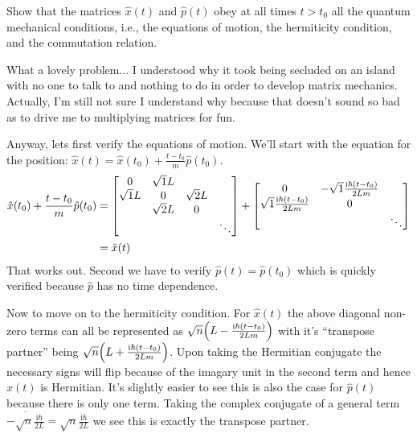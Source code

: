 \documentclass[boxes,pages]{homework}
\makeatletter
\newcommand{\iu}{\mathrm{i}}
\numberwithin{@problem}{section}
\makeatother
\begin{document}
\begin{problem}
Show that the matrices $\hat{x}(t)$ and $\hat{p}(t)$ obey at all times $t > t_0$ all the quantum mechanical conditions, i.e., the equations of motion, the hermiticity condition, and the commutation relation.
\end{problem}

\begin{solution}
	What a lovely problem... I understood why it took being secluded on an island with no one to talk to and nothing to do in order to develop matrix mechanics. Actually, I'm still not sure I understand why because that doesn't sound so bad as to drive me to multiplying matrices for fun.

	Anyway, lets first verify the equations of motion. We'll start with the equation for the position: $\hat{x}(t) = \hat{x}(t_0) + \frac{t - t_0}{m}\hat{p}(t_0)$.
	\begin{align*}
		\hat{x}(t_0) + \frac{t - t_0}{m}\hat{p}(t_0) & = \mqty[0 & \sqrt{1}L & & \\ \sqrt{1}L & 0 & \sqrt{2}L & \\ & \sqrt{2}L & 0 & \\ & & & \ddots] + \mqty[0 & -\sqrt{1}\frac{\iu\hbar(t - t_0)}{2Lm} & \\ \sqrt{1}\frac{\iu\hbar(t - t_0)}{2Lm} & 0 & \\ & & \ddots] \\
		& = \hat{x}(t)
	\end{align*}
	That works out. Second we have to verify $\hat{p}(t) = \hat{p}(t_0)$ which is quickly verified because $\hat{p}$ has no time dependence.

	Now to move on to the hermiticity condition. For $\hat{x}(t)$ the above diagonal non-zero terms can all be represented as $\sqrt{n}\qty(L - \frac{\iu\hbar(t - t_0)}{2Lm})$ with it's ``transpose partner'' being $\sqrt{n}\qty(L + \frac{\iu\hbar(t - t_0)}{2Lm})$. Upon taking the Hermitian conjugate the necessary signs will flip because of the imagary unit in the second term and hence $\hat{x}(t)$ is Hermitian. It's slightly easier to see this is also the case for $\hat{p}(t)$ because there is only one term. Taking the complex conjugate of a general term $\overline{-\sqrt{n}\frac{\iu\hbar}{2L}} =\sqrt{n}\frac{\iu\hbar}{2L}$ we see this is exactly the transpose partner.


\end{solution}
\end{document}
